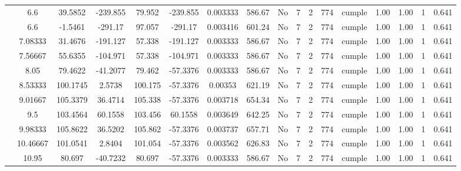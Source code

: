\begin{table}[H]
{\begin{tabular}{|c|c|c|c|c|c|c|c|c|c|c|c|c|c|c|c|c|}
\cline{2-17}        & \cellcolor[rgb]{ .851,  .882,  .949}6.6 & 39.5852 & -239.855 & 79.952 & -239.855 & 0.003333 & 586.67 & No  & 7   & 2   & 774 & \cellcolor[rgb]{ .776,  .937,  .808}cumple & 1.00 & 1.00 & 1   & 0.641 \bigstrut\\
\cline{2-17}        & \cellcolor[rgb]{ .851,  .882,  .949}6.6 & -1.5461 & -291.17 & 97.057 & -291.17 & 0.003416 & 601.24 & No  & 7   & 2   & 774 & \cellcolor[rgb]{ .776,  .937,  .808}cumple & 1.00 & 1.00 & 1   & 0.641 \bigstrut\\
\cline{2-17}        & 7.08333 & 31.4676 & -191.127 & 57.338 & -191.127 & 0.003333 & 586.67 & No  & 7   & 2   & 774 & \cellcolor[rgb]{ .776,  .937,  .808}cumple & 1.00 & 1.00 & 1   & 0.641 \bigstrut\\
\cline{2-17}        & 7.56667 & 55.6355 & -104.971 & 57.338 & -104.971 & 0.003333 & 586.67 & No  & 7   & 2   & 774 & \cellcolor[rgb]{ .776,  .937,  .808}cumple & 1.00 & 1.00 & 1   & 0.641 \bigstrut\\
\cline{2-17}        & 8.05 & 79.4622 & -41.2077 & 79.462 & -57.3376 & 0.003333 & 586.67 & No  & 7   & 2   & 774 & \cellcolor[rgb]{ .776,  .937,  .808}cumple & 1.00 & 1.00 & 1   & 0.641 \bigstrut\\
\cline{2-17}        & 8.53333 & 100.1745 & 2.5738 & 100.175 & -57.3376 & 0.00353 & 621.19 & No  & 7   & 2   & 774 & \cellcolor[rgb]{ .776,  .937,  .808}cumple & 1.00 & 1.00 & 1   & 0.641 \bigstrut\\
\cline{2-17}        & 9.01667 & 105.3379 & 36.4714 & 105.338 & -57.3376 & 0.003718 & 654.34 & No  & 7   & 2   & 774 & \cellcolor[rgb]{ .776,  .937,  .808}cumple & 1.00 & 1.00 & 1   & 0.641 \bigstrut\\
\cline{2-17}        & 9.5 & 103.4564 & 60.1558 & 103.456 & 60.1558 & 0.003649 & 642.25 & No  & 7   & 2   & 774 & \cellcolor[rgb]{ .776,  .937,  .808}cumple & 1.00 & 1.00 & 1   & 0.641 \bigstrut\\
\cline{2-17}        & 9.98333 & 105.8622 & 36.5202 & 105.862 & -57.3376 & 0.003737 & 657.71 & No  & 7   & 2   & 774 & \cellcolor[rgb]{ .776,  .937,  .808}cumple & 1.00 & 1.00 & 1   & 0.641 \bigstrut\\
\cline{2-17}        & 10.46667 & 101.0541 & 2.8404 & 101.054 & -57.3376 & 0.003562 & 626.83 & No  & 7   & 2   & 774 & \cellcolor[rgb]{ .776,  .937,  .808}cumple & 1.00 & 1.00 & 1   & 0.641 \bigstrut\\
\cline{2-17}        & 10.95 & 80.697 & -40.7232 & 80.697 & -57.3376 & 0.003333 & 586.67 & No  & 7   & 2   & 774 & \cellcolor[rgb]{ .776,  .937,  .808}cumple & 1.00 & 1.00 & 1   & 0.641 \bigstrut\\

\end{tabular}}
\end{table}
